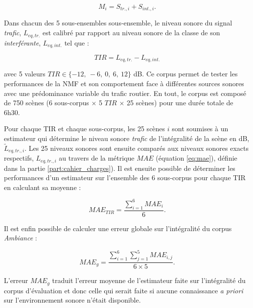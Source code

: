 \begin{equation}
M_i = S_{tr.,i}+S_{int.,i}.
\end{equation}

Dans chacun des 5 sous-ensembles sous-ensemble, le niveau sonore du signal \textit{trafic}, $L_{eq,tr.}$ est calibré par rapport au niveau sonore de la classe de son \textit{interférante}, $L_{eq,int.}$ tel que :

\begin{equation}
TIR = L_{eq,tr.} - L_{eq,int.}
\end{equation}

avec 5 valeurs $TIR \in \lbrace -12,~-6,~0,~6,~12 \rbrace$ dB. Ce corpus permet de tester les performances de la NMF et son comportement face à différentes sources sonores avec une prédominance variable du trafic routier. En tout, le corpus est composé de 750 scènes (6 sous-corpus $\times$ 5 $TIR$ $\times$ 25 scènes) pour une durée totale de 6h30.

Pour chaque TIR et chaque sous-corpus, les 25 scènes $i$ sont soumises à un estimateur qui détermine le niveau sonore \textit{trafic} de l'intégralité de la scène en dB,  $\tilde{L}_{eq,tr., i}$. Les 25 niveaux sonores sont ensuite comparés aux niveaux sonores exacts respectifs, $L_{eq,tr., i}$ au travers de la métrique $MAE$ (équation \ref{eq:mae}), définie dans la partie \ref{part:cahier_charges}). Il est ensuite possible de déterminer les performances d'un estimateur sur l'ensemble des 6 sous-corpus pour chaque TIR en calculant sa moyenne :

\begin{equation}\label{eq:mae_tir}
MAE_{TIR} = \frac{\sum_{i = 1}^6 MAE_{i}}{6}.
\end{equation}

Il est enfin possible de calculer une erreur globale sur l'intégralité du corpus \textit{Ambiance}  :

\begin{equation}\label{eq:mae_g}
MAE_{g} = \frac{\sum_{i = 1}^6 \sum_{j = 1}^5 MAE_{i,j}}{6 \times 5}.
\end{equation}

L'erreur $MAE_g$ traduit l'erreur moyenne de l'estimateur faite sur l'intégralité du corpus d'évaluation et donc celle qui serait faite si aucune connaissance \textit{a priori} sur l'environnement sonore n'était disponible.

